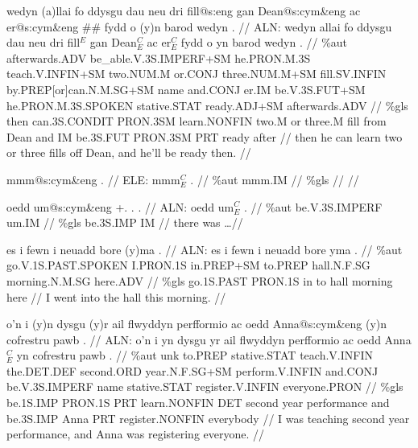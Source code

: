 \documentclass[a4paper,10pt]{article}
\begin{document}
\ex
\begingl[lingstyle=gergl]
\glchat wedyn (a)llai fo ddysgu dau neu dri fill@s:eng gan Dean@s:cym\&eng ac er@s:cym\&eng \#\# fydd o (y)n barod wedyn . //
\glsurface ALN:  wedyn allai fo ddysgu dau neu dri fill$^{E}$ gan Dean$^{C}_{E}$ ac er$^{C}_{E}$ fydd o yn barod wedyn .  //
\glauto \%aut  afterwards{\scriptsize .ADV} be\_able{\scriptsize .V.3S.IMPERF+SM} he{\scriptsize .PRON.M.3S} teach{\scriptsize .V.INFIN+SM} two{\scriptsize .NUM.M} or{\scriptsize .CONJ} three{\scriptsize .NUM.M+SM} fill{\scriptsize .SV.INFIN} by{\scriptsize .PREP[or]can.N.M.SG+SM} name and{\scriptsize .CONJ} er{\scriptsize .IM} be{\scriptsize .V.3S.FUT+SM} he{\scriptsize .PRON.M.3S.SPOKEN} stative{\scriptsize .STAT} ready{\scriptsize .ADJ+SM} afterwards{\scriptsize .ADV}   //
\glmanual \%gls  then can{\scriptsize .3S.CONDIT} PRON{\scriptsize .3SM} learn{\scriptsize .NONFIN} two{\scriptsize .M} or three{\scriptsize .M} fill from Dean and IM be{\scriptsize .3S.FUT} PRON{\scriptsize .3SM} PRT ready after   //
\gleng then he can learn two or three fills off Dean, and he'll be ready then. //
\endgl
\xe

\ex
\begingl[lingstyle=gergl]
\glchat mmm@s:cym\&eng . //
\glsurface ELE:  mmm$^{C}_{E}$ .  //
\glauto \%aut  mmm{\scriptsize .IM}   //
\glmanual \%gls     //
\gleng  //
\endgl
\xe

\ex
\begingl[lingstyle=gergl]
\glchat oedd um@s:cym\&eng +. . . //
\glsurface ALN:  oedd um$^{C}_{E}$ .  //
\glauto \%aut  be{\scriptsize .V.3S.IMPERF} um{\scriptsize .IM}   //
\glmanual \%gls  be{\scriptsize .3S.IMP} IM   //
\gleng there was \dots  //
\endgl
\xe

\ex
\begingl[lingstyle=gergl]
\glchat es i fewn i neuadd bore (y)ma . //
\glsurface ALN:  es i fewn i neuadd bore yma .  //
\glauto \%aut  go{\scriptsize .V.1S.PAST.SPOKEN} I{\scriptsize .PRON.1S} in{\scriptsize .PREP+SM} to{\scriptsize .PREP} hall{\scriptsize .N.F.SG} morning{\scriptsize .N.M.SG} here{\scriptsize .ADV}   //
\glmanual \%gls  go{\scriptsize .1S.PAST} PRON{\scriptsize .1S} in to hall morning here   //
\gleng I went into the hall this morning. //
\endgl
\xe

\ex
\begingl[lingstyle=gergl]
\glchat o'n i (y)n dysgu (y)r ail flwyddyn perfformio ac oedd Anna@s:cym\&eng (y)n cofrestru pawb . //
\glsurface ALN:  o'n i yn dysgu yr ail flwyddyn perfformio ac oedd Anna$^{C}_{E}$ yn cofrestru pawb .  //
\glauto \%aut  unk to{\scriptsize .PREP} stative{\scriptsize .STAT} teach{\scriptsize .V.INFIN} the{\scriptsize .DET.DEF} second{\scriptsize .ORD} year{\scriptsize .N.F.SG+SM} perform{\scriptsize .V.INFIN} and{\scriptsize .CONJ} be{\scriptsize .V.3S.IMPERF} name stative{\scriptsize .STAT} register{\scriptsize .V.INFIN} everyone{\scriptsize .PRON}   //
\glmanual \%gls  be{\scriptsize .1S.IMP} PRON{\scriptsize .1S} PRT learn{\scriptsize .NONFIN} DET second year performance and be{\scriptsize .3S.IMP} Anna PRT register{\scriptsize .NONFIN} everybody   //
\gleng I was teaching second year performance, and Anna was registering everyone. //
\endgl
\xe
\end{document}
